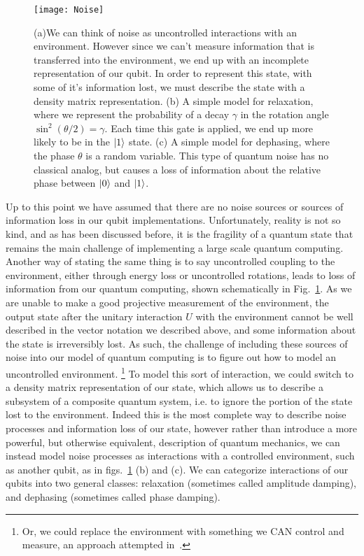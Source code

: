 \begin{figure}
  \texttt{[image: Noise]}
  \caption[Noise affecting pure states]
  {(a)We can think of noise as uncontrolled interactions with an environment. However since we can't measure
  information that is transferred into the environment, we end up with an incomplete representation of our qubit.
  In order to represent this state, with some of it's information lost, we must describe the state with a density
  matrix representation. (b) A simple model for relaxation, where we represent the probability of a decay $\gamma$
  in the rotation angle $\sin^2(\theta/2) = \gamma$. Each time this gate is applied, we end up more likely to be in
  the $\ket{1}$ state. (c) A simple model for dephasing, where the phase $\theta$ is a random variable. This type
  of quantum noise has no classical analog, but causes a loss of information about the relative phase between $\ket{0}$
  and $\ket{1}$.}
  \label{fig:noise}
\end{figure}

Up to this point we have assumed that there are no noise sources or sources of information loss in our
qubit implementations. Unfortunately, reality is not so kind, and as has been discussed before, it is the
fragility of a quantum state that remains the main challenge of implementing a large scale quantum computing.
Another way of stating the same thing is to say uncontrolled coupling to the environment, either through
energy loss or uncontrolled rotations, leads to loss of information from our quantum computing, shown schematically
in Fig.~\ref{fig:noise}. As we are unable to make a good projective measurement of the environment, the output
state after the unitary interaction $U$ with the environment cannot be well described in the vector notation we
described above, and some information about the state is irreversibly lost. As such, the challenge of including
these sources of noise into our model of quantum computing is to figure out how to model an uncontrolled environment.
\footnote{Or, we could replace the environment with something we CAN control and measure, an approach attempted
in~\cite{2018arXiv180300545M}.}
To model this sort of interaction, we could switch to a density matrix representation of our state, which allows us
to describe a subsystem of a composite quantum system, i.e. to ignore the portion of the state lost to the environment.
Indeed this is the most complete way to describe noise processes and information loss of our state, however rather
than introduce a more powerful, but otherwise equivalent, description of quantum mechanics, we can instead model
noise processes as interactions with a controlled environment, such as another qubit, as in figs.~\ref{fig:noise} (b) and (c).
We can categorize interactions of our qubits into two general classes: relaxation (sometimes called amplitude
damping), and dephasing (sometimes called phase damping).

